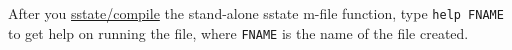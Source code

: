 


	After you \url{sstate/compile} the stand-alone sstate m-file function,
 type \texttt{help FNAME} to get help on running the file, where
 \texttt{FNAME} is the name of the file created.


